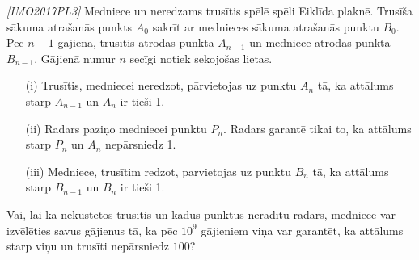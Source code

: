 \begin{problem}
\textit{[IMO2017PL3]}
Medniece un neredzams trusītis spēlē spēli Eiklīda plaknē. Trusīša sākuma atrašanās punkts $A_0$ sakrīt ar mednieces sākuma atrašanās punktu $B_0$. Pēc $n-1$ gājiena, trusītis atrodas punktā $A_{n-1}$ un medniece atrodas punktā $B_{n-1}$. Gājienā numur $n$ secīgi notiek sekojošas lietas.
\begin{itemize}
\item[(i)]
Trusītis, medniecei neredzot, pārvietojas uz punktu $A_n$ tā, ka attālums starp $A_{n-1}$ un $A_n$ ir tieši 1.
\item[(ii)]
Radars paziņo medniecei punktu $P_n$. Radars garantē tikai to, ka attālums starp $P_n$ un $A_n$ nepārsniedz 1.
\item[(iii)]
Medniece, trusītim redzot, parvietojas uz punktu $B_n$ tā, ka attālums starp $B_{n-1}$ un $B_n$ ir \newline tieši 1.
\end{itemize}

Vai, lai kā nekustētos trusītis un kādus punktus nerādītu radars, medniece var izvēlēties savus gājienus tā, ka pēc $10^9$ gājieniem viņa var garantēt, ka attālums starp viņu un trusīti nepārsniedz $100$?
\end{problem}

